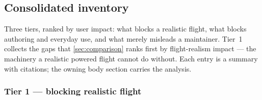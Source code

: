 \subsection{Consolidated inventory}\label{sec:roadmap-inventory}

Three tiers, ranked by user impact: what blocks a realistic flight, what blocks authoring and
everyday use, and what merely misleads a maintainer. Tier~1 collects the gaps that
\cref{sec:comparison} ranks first by flight-realism impact --- the machinery a realistic
powered flight cannot do without. Each entry is a summary with citations; the owning body section carries the analysis.

\subsubsection*{Tier 1 --- blocking realistic flight}

